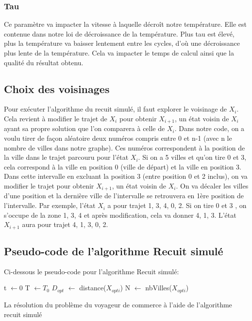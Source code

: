 \documentclass{article}
\begin{document}
\subsubsection{Tau}
 Ce paramètre va impacter la vitesse à laquelle décroît notre température. Elle est contenue dans notre loi de décroissance de la température. Plus tau est élevé, plus la température va baisser lentement entre les cycles, d’où une décroissance plus lente de la température. Cela va impacter le temps de calcul ainsi que la qualité du résultat obtenu. 
\subsection{Choix des voisinages}
Pour exécuter l’algorithme du recuit simulé, il faut explorer le voisinage de \(X_i\). Cela revient à modifier le trajet de \(X_i\) pour obtenir \(X_{i+1}\), un état voisin de \(X_i\) ayant sa propre solution que l’on comparera à celle de \(X_i\). Dans notre code, on a voulu tirer de façon aléatoire deux numéros compris entre 0 et n-1 (avec n le nombre de villes dans notre graphe). Ces numéros correspondent à la position de la ville dans le trajet parcouru pour l’état \(X_i\). Si on a 5 villes et qu’on tire 0 et 3, cela correspond à la ville en position 0 (ville de départ) et la ville en position 3.  Dans cette intervalle en excluant la position 3 (entre position 0 et 2 inclus), on va modifier le trajet pour obtenir \(X_{i+1}\), un état voisin de \(X_i\). On va décaler les villes d’une position et la dernière ville de l’intervalle se retrouvera en 1ère position de l’intervalle. 
Par exemple, l’état \(X_i\) a pour trajet 1, 3, 4, 0, 2. Si on tire 0 et 3 , on s’occupe de la zone 1, 3, 4 et après modification, cela va donner 4, 1, 3. L’état \(X_{i+1}\) aura pour trajet 4, 1, 3, 0, 2.
\subsection{Pseudo-code de l'algorithme Recuit simulé}
Ci-dessous le pseudo-code pour l'algorithme Recuit simulé:\\
\begin{algorithm}[H] 
   t \(\leftarrow 0\)  \;
   T \(\leftarrow T_0\)  \;
   \(D_{opt}\) \(\leftarrow \) distance(\(X_{opti}\))  \;
   N \(\leftarrow \) nbVilles(\(X_{opti}\))  \;	
  
 \caption{La résolution du problème du voyageur de commerce à l'aide de l'algorithme recuit simulé}
\end{algorithm}
\end{document}
